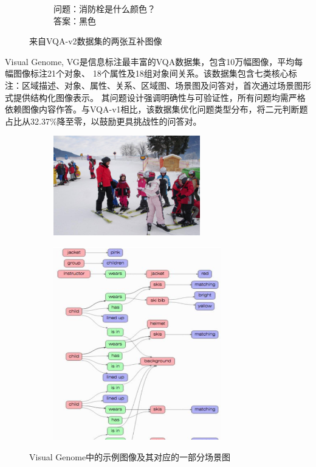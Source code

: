 \begin{figure}[h]
\begin{subfigure}[b]{0.45\textwidth}
        \caption*{\footnotesize 问题：消防栓是什么颜色？\\答案：黑色}
        \label{fig:example-from-vqa-v2-2}
    \end{subfigure}
    \caption{来自VQA-v2数据集的两张互补图像}
    \label{fig:example-from-vqa-v2}
\end{figure}

Visual Genome, VG​\cite{krishna2017visual}是信息标注最丰富的VQA数据集，包含10万幅图像，平均每幅图像标注21个对象、
18个属性及18组对象间关系。该数据集包含七类核心标注：区域描述、对象、属性、关系、区域图、场景图及问答对，首次通过场景图形式提供结构化图像表示。
其问题设计强调明确性与可验证性，所有问题均需严格依赖图像内容作答。与VQA-v1相比，该数据集优化问题类型分布，将二元判断题占比从32.37\%降至零，以鼓励更具挑战性的问答对。
\begin{figure}[htbp]
    \centering
    \begin{subfigure}[b]{0.45\textwidth}
        \centering
        \includegraphics[width=0.7\textwidth, keepaspectratio]{figures/visual-genome-a.png}
    \end{subfigure}
    \hfill
    \begin{subfigure}[b]{0.45\textwidth}
        \centering
        \includegraphics[width=0.8\textwidth, keepaspectratio]{figures/visual-genome-b.png}
    \end{subfigure}
    \caption{Visual Genome中的示例图像及其对应的一部分场景图}
\end{figure}

